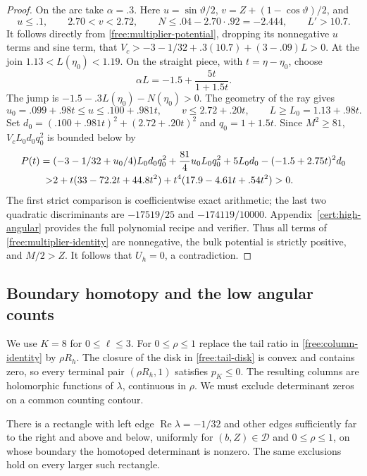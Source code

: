 \begin{proof}
On the arc take $\alpha=.3$.  Here
$u=\sin\vartheta/2$, $v=Z+(1-\cos\vartheta)/2$, and
\[
 u\le.1,\qquad 2.70<v<2.72,\qquad
 N\le.04-2.70\cdot.92=-2.444,
 \qquad L'>10.7.
\]
It follows directly from \eqref{free:multiplier-potential}, dropping
its nonnegative $u$ terms and sine term, that
$V_c>-3-1/32+.3(10.7)+(3-.09)L>0$.
At the join $1.13<L(\eta_0)<1.19$.  On the straight piece, with
$t=\eta-\eta_0$, choose
\[
 \alpha L=-1.5+\frac{5t}{1+1.5t}.
\]
The jump is $-1.5-.3L(\eta_0)-N(\eta_0)>0$.
The geometry of the ray gives
\[
 u_0=.099+.98t\le u\le.100+.981t,\qquad
 v\le2.72+.20t,\qquad L\ge L_0=1.13+.98t.
\]
Set $d_0=(.100+.981t)^2+(2.72+.20t)^2$ and $q_0=1+1.5t$.
Since $M^2\ge81$, $V_cL_0d_0q_0^2$ is bounded below by
\begin{align}\label{free:high-polynomial}
 P(t)={}&(-3-1/32+u_0/4)L_0d_0q_0^2
 +\frac{81}{4}u_0L_0q_0^2+5L_0d_0
 -(-1.5+2.75t)^2d_0\notag\\
 >&2+t(33-72.2t+44.8t^2)
       +t^4(17.9-4.61t+.54t^2)>0.
\end{align}
The first strict comparison is coefficientwise exact arithmetic; the
last two quadratic discriminants are $-17519/25$ and
$-174119/10000$.  Appendix~\ref{cert:high-angular} provides the full
polynomial recipe and verifier.  Thus all terms of
\eqref{free:multiplier-identity} are nonnegative, the bulk potential is
strictly positive, and $M/2>Z$.  It follows that $U_h=0$, a
contradiction.
\end{proof}

\subsection{Boundary homotopy and the low angular counts}

We use $K=8$ for $0\le\ell\le3$.  For $0\le\rho\le1$ replace the tail
ratio in \eqref{free:column-identity} by $\rho R_h$.  The closure of
the disk in \eqref{free:tail-disk} is convex and contains zero, so every terminal
pair $(\rho R_h,1)$ satisfies $p_K\le0$.  The resulting columns are
holomorphic functions of $\lambda$, continuous in $\rho$.  We must
exclude determinant zeros on a common counting contour.

\begin{lemma}\label{free:boundary}
There is a rectangle with left edge $\operatorname{Re}\lambda=-1/32$
and other edges sufficiently far to the right and above and below,
uniformly for $(b,Z)\in\mathcal D$ and $0\le\rho\le1$, on whose
boundary the homotoped determinant is nonzero.  The same exclusions
hold on every larger such rectangle.
\end{lemma}

